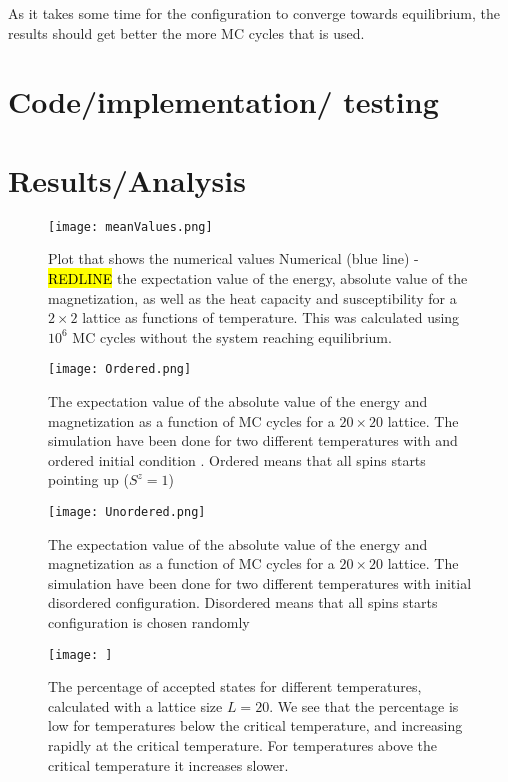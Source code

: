 \documentclass{article}
\begin{document}
As it takes some time for the configuration to converge towards equilibrium, the results should get better the more MC cycles that is used.



\section{Code/implementation/ testing}
\section{Results/Analysis}


\begin{figure}[H]
	\centering
	\texttt{[image: meanValues.png]}
	\centering
	\caption{Plot that shows the numerical values Numerical (blue line) - \hl{REDLINE} the expectation value of the energy, absolute value of the magnetization, as well as the heat capacity and susceptibility for a $2\times 2$ lattice as functions of temperature. This was calculated using $10^6$ MC cycles without the system reaching equilibrium.}
	\label{fig: integration limits Gauss-Legendre}
\end{figure}



\begin{figure}[H]
	\centering
	\texttt{[image: Ordered.png]}
	\centering
	\caption{The expectation value of the absolute value of the energy and magnetization as a function of MC cycles for a $20 \times 20$  lattice. The simulation have been done for two different temperatures with and ordered initial condition . Ordered means that all spins starts pointing up ($S^z = 1$)}
	\label{fig: integration limits Gauss-Legendre}
\end{figure}

\begin{figure}[H]
	\centering
	\texttt{[image: Unordered.png]}
	\centering
	\caption{The expectation value of the absolute value of the energy and magnetization as a function of MC cycles for a $20 \times 20$ lattice. The simulation have been done for two different temperatures with  initial disordered configuration. Disordered means that all spins starts configuration is chosen randomly}
	\label{fig: integration limits Gauss-Legendre}
\end{figure}

\begin{figure}[H]
	\centering
	\texttt{[image: ]}
	\centering
	\caption{The percentage of accepted states for different temperatures, calculated with a lattice size $L = 20$. We see that the percentage is low for temperatures below the critical temperature, and increasing rapidly at the critical temperature. For temperatures above the critical temperature it increases slower.}
	\label{fig: integration limits Gauss-Legendre}
\end{figure}
\end{document}
